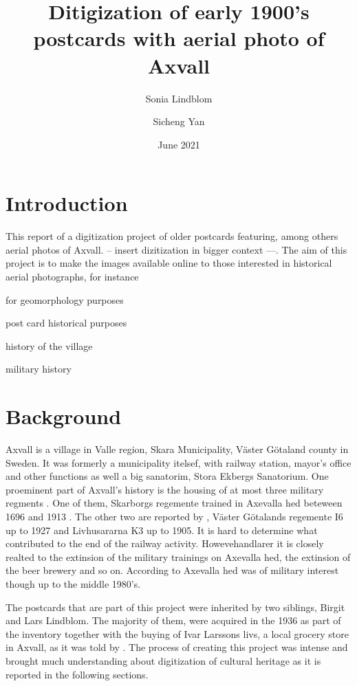 \documentclass[12 pt]{paper}
\title{%
Ditigization of early 1900's  postcards with aerial photo of Axvall }
\author{Sonia Lindblom \and Sicheng Yan}
\date{June 2021}
\begin{document}


\section{Introduction}
This report of a digitization project of older postcards featuring, among others aerial photos of Axvall. -- insert dizitization in  bigger context ---. The aim of this project is to make the images available online to those interested in historical aerial photographs, for instance 
\begin{inparaenum}[i)]
	\item for geomorphology purposes \autocite[cf.][]{gomez2015}
	\item post card historical purposes
	\item history of the village
	\item military history
\end{inparaenum}


 
\section{Background}
Axvall is a village in Valle region, Skara Municipality, Väster Götaland county in Sweden. It was formerly a municipality itelsef, with railway station, mayor's office and other functions as well a big sanatorim, Stora Ekbergs Sanatorium. One proeminent part of Axvall's history is the housing of at most three military regments \autocite[]{broden2021}. One of them, Skarborgs regemente trained in Axevalla hed beteween 1696 and 1913 \autocite{frykmer1992}. The other two are reported by \textcite{broden2021}, Väster Götalands regemente I6 up to 1927 and Livhusararna K3 up to 1905. It is hard to determine what contributed to the end of the railway activity. Howevehandlarer it is closely realted to the extinsion of the military trainings on Axevalla hed, the extinsion of the beer brewery and so on. According to \textcite{broden2021} Axevalla hed was of military interest though up to the middle 1980's.

The postcards that are part of this project were inherited by two siblings, Birgit and Lars Lindblom. The majority of them, were acquired in the 1936 as part of the inventory together with the buying of Ivar Larssons livs, a local grocery store in Axvall, as it was told by \autocite[]{Lars}. The process of creating this project was intense and brought much understanding about digitization of cultural heritage as it is reported in the following sections. 
\end{document}
